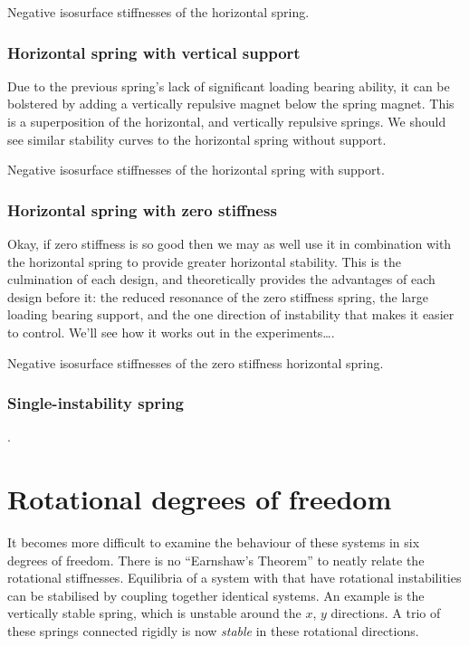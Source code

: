 \documentclass[11pt,a4paper]{memoir}
\begin{document}
  {Negative isosurface stiffnesses of the horizontal spring.}

\subsubsection{Horizontal spring with vertical support}

Due to the previous spring's lack of significant loading bearing ability, it
can be bolstered by adding a vertically repulsive magnet below the spring
magnet. This is a superposition of the horizontal, and vertically repulsive
springs. We should see similar stability curves to the horizontal spring
without support.

  {Negative isosurface stiffnesses of the horizontal spring with support.}

\subsubsection{Horizontal spring with zero stiffness}

Okay, if zero stiffness is so good then we may as well use it in combination
with the horizontal spring to provide greater horizontal stability. This is
the culmination of each design, and theoretically provides the advantages of
each design before it: the reduced resonance of the zero stiffness spring, the
large loading bearing support, and the one direction of instability that makes
it easier to control. We'll see how it works out in the experiments\dots.

  {Negative isosurface stiffnesses of the zero stiffness horizontal spring.}


\subsubsection{Single-instability spring}

\cite{choi2003}. 



\section{Rotational degrees of freedom}

It becomes more difficult to examine the behaviour of these systems in
six degrees of freedom. There is no ``Earnshaw's Theorem'' to neatly
relate the rotational stiffnesses. Equilibria of a system with that
have rotational instabilities can be stabilised by coupling together
identical systems. An example is the vertically stable spring, which
is unstable around the $x$, $y$ directions. A trio of these springs
connected rigidly is now \emph{stable} in these rotational directions.
\end{document}
